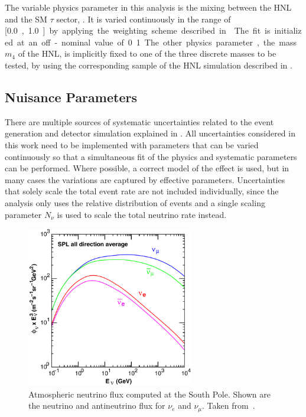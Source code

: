 The variable physics parameter in this analysis is the mixing between the HNL and the SM $\tau$ sector, . It is varied continuously in the range of [\SI{0.0}, \SI{1.0}] by applying the weighting scheme described in . The fit is initialized at an off-nominal value of 0.1. The other physics parameter, the mass $m_4$ of the HNL, is implicitly fixed to one of the three discrete masses to be tested, by using the corresponding sample of the HNL simulation described in .


\subsection{Nuisance Parameters} 

There are multiple sources of systematic uncertainties related to the event generation and detector simulation explained in . All uncertainties considered in this work need to be implemented with parameters that can be varied continuously so that a simultaneous fit of the physics and systematic parameters can be performed. Where possible, a correct model of the effect is used, but in many cases the variations are captured by effective parameters. Uncertainties that solely scale the total event rate are not included individually, since the analysis only uses the relative distribution of events and a single scaling parameter $N_{\nu}$ is used to scale the total neutrino rate instead.


\begin{figure}[h]
    \centering 
    \includegraphics[width=0.65\textwidth]{figures/simulation_and_processing/flux/honda_flux_spl.png}
    \caption[South pole atmospheric neutrino flux]{Atmospheric neutrino flux computed at the South Pole. Shown are the neutrino and antineutrino flux for $\nu_e$ and $\nu_\mu$. Taken from~\cite{PhysRevD.92.023004_Honda_Flux}.}
\end{figure}


